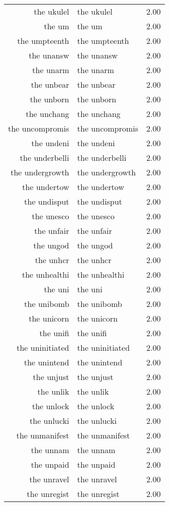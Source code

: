\begin{table}[ht]
\begin{tabular}{rlr}
  the ukulel & the ukulel & 2.00 \\ 
  the um & the um & 2.00 \\ 
  the umpteenth & the umpteenth & 2.00 \\ 
  the unansw & the unansw & 2.00 \\ 
  the unarm & the unarm & 2.00 \\ 
  the unbear & the unbear & 2.00 \\ 
  the unborn & the unborn & 2.00 \\ 
  the unchang & the unchang & 2.00 \\ 
  the uncompromis & the uncompromis & 2.00 \\ 
  the undeni & the undeni & 2.00 \\ 
  the underbelli & the underbelli & 2.00 \\ 
  the undergrowth & the undergrowth & 2.00 \\ 
  the undertow & the undertow & 2.00 \\ 
  the undisput & the undisput & 2.00 \\ 
  the unesco & the unesco & 2.00 \\ 
  the unfair & the unfair & 2.00 \\ 
  the ungod & the ungod & 2.00 \\ 
  the unhcr & the unhcr & 2.00 \\ 
  the unhealthi & the unhealthi & 2.00 \\ 
  the uni & the uni & 2.00 \\ 
  the unibomb & the unibomb & 2.00 \\ 
  the unicorn & the unicorn & 2.00 \\ 
  the unifi & the unifi & 2.00 \\ 
  the uninitiated & the uninitiated & 2.00 \\ 
  the unintend & the unintend & 2.00 \\ 
  the unjust & the unjust & 2.00 \\ 
  the unlik & the unlik & 2.00 \\ 
  the unlock & the unlock & 2.00 \\ 
  the unlucki & the unlucki & 2.00 \\ 
  the unmanifest & the unmanifest & 2.00 \\ 
  the unnam & the unnam & 2.00 \\ 
  the unpaid & the unpaid & 2.00 \\ 
  the unravel & the unravel & 2.00 \\ 
  the unregist & the unregist & 2.00 \\ 

\end{tabular}
\end{table}
